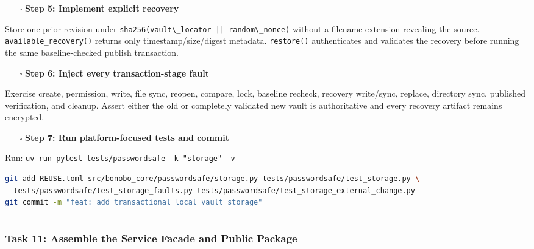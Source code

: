 \documentclass[
  letterpaper,
]{article}
\newcommand{\passthrough}[1]{#1}
\providecommand{\tightlist}{%
  \setlength{\itemsep}{0pt}\setlength{\parskip}{0pt}}
\begin{document}
\begin{itemize}
\tightlist
\item[$\square$]
  \textbf{Step 5: Implement explicit recovery}
\end{itemize}

Store one prior revision under \passthrough{\lstinline!sha256(vault\_locator || random\_nonce)!} without a filename
extension revealing the source. \nolinkurl{available_recovery()} returns only timestamp/size/digest metadata.
\passthrough{\lstinline!restore()!} authenticates and validates the recovery before running the same baseline-checked
publish transaction.

\begin{itemize}
\tightlist
\item[$\square$]
  \textbf{Step 6: Inject every transaction-stage fault}
\end{itemize}

Exercise create, permission, write, file sync, reopen, compare, lock, baseline recheck, recovery write/sync, replace,
directory sync, published verification, and cleanup. Assert either the old or completely validated new vault is
authoritative and every recovery artifact remains encrypted.

\begin{itemize}
\tightlist
\item[$\square$]
  \textbf{Step 7: Run platform-focused tests and commit}
\end{itemize}

Run: \passthrough{\lstinline!uv run pytest tests/passwordsafe -k "storage" -v!}

\begin{lstlisting}[language=bash]
git add REUSE.toml src/bonobo_core/passwordsafe/storage.py tests/passwordsafe/test_storage.py \
  tests/passwordsafe/test_storage_faults.py tests/passwordsafe/test_storage_external_change.py
git commit -m "feat: add transactional local vault storage"
\end{lstlisting}

\begin{center}\rule{0.5\linewidth}{0.5pt}\end{center}

\subsubsection{Task 11: Assemble the Service Facade and Public
Package}\label{task-11-assemble-the-service-facade-and-public-package}
\end{document}
